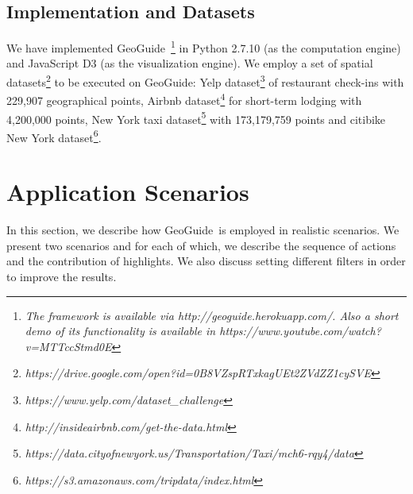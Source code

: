 \documentclass[conference,compsoc]{IEEEtran}
\newcommand{\framework}{{\sc GeoGuide}}
\begin{document}
\subsection{Implementation and Datasets}
We have implemented \framework\ \footnote{\it The framework is available via http://geoguide.herokuapp.com/. Also a short demo of its functionality is available in https://www.youtube.com/watch?v=MTTccStmd0E} in Python 2.7.10 (as the computation engine) and JavaScript D3 (as the visualization engine). We employ a set of spatial datasets\footnote{\it https://drive.google.com/open?id=0B8VZspRTxkagUEt2ZVdZZ1cySVE} to be executed on \framework: Yelp dataset\footnote{\it https://www.yelp.com/dataset\_challenge} of restaurant check-ins with 229,907 geographical points, Airbnb dataset\footnote{\it http://insideairbnb.com/get-the-data.html} for short-term lodging with 4,200,000 points, New York taxi dataset\footnote{\it https://data.cityofnewyork.us/Transportation/Taxi/mch6-rqy4/data} with 173,179,759 points and citibike New York dataset\footnote{\it https://s3.amazonaws.com/tripdata/index.html}.

\section{Application Scenarios}
\label{sec:scenario}
In this section, we describe how \framework\ is employed in realistic scenarios. We present two scenarios and for each of which, we describe the sequence of actions and the contribution of highlights. We also discuss setting different filters in order to improve the results.
\end{document}
